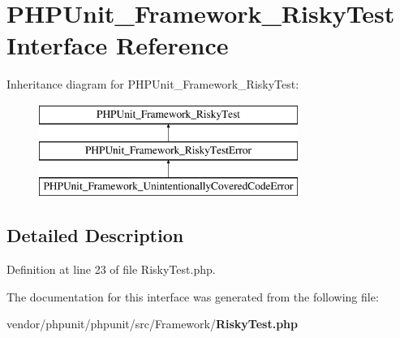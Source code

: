 \section{P\+H\+P\+Unit\+\_\+\+Framework\+\_\+\+Risky\+Test Interface Reference}
\label{interface_p_h_p_unit___framework___risky_test}
Inheritance diagram for P\+H\+P\+Unit\+\_\+\+Framework\+\_\+\+Risky\+Test\+:\begin{figure}[H]
\begin{center}
\leavevmode
\includegraphics[height=3.000000cm]{interface_p_h_p_unit___framework___risky_test}
\end{center}
\end{figure}


\subsection{Detailed Description}


Definition at line 23 of file Risky\+Test.\+php.



The documentation for this interface was generated from the following file\+:\begin{DoxyCompactItemize}
\item 
vendor/phpunit/phpunit/src/\+Framework/{\bf Risky\+Test.\+php}\end{DoxyCompactItemize}
